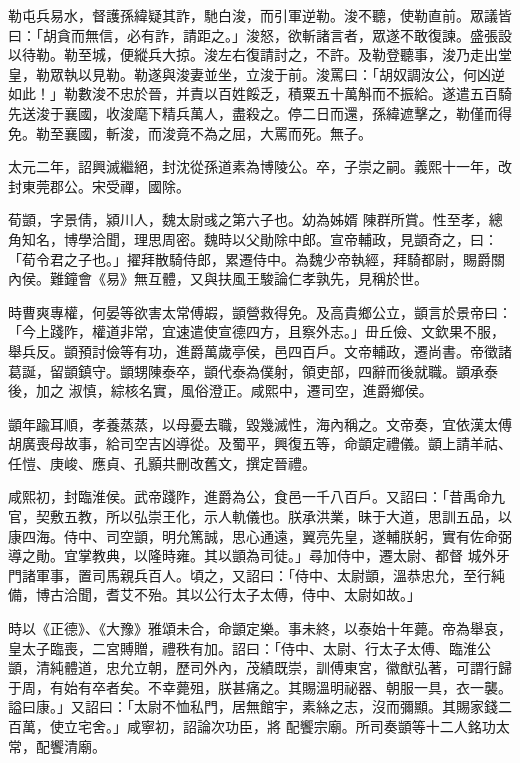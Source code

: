 \begin{pinyinscope}
 勒屯兵易水，督護孫緯疑其詐，馳白浚，而引軍逆勒。浚不聽，使勒直前。眾議皆曰：「胡貪而無信，必有詐，請距之。」浚怒，欲斬諸言者，眾遂不敢復諫。盛張設以待勒。勒至城，便縱兵大掠。浚左右復請討之，不許。及勒登聽事，浚乃走出堂
 皇，勒眾執以見勒。勒遂與浚妻並坐，立浚于前。浚罵曰：「胡奴調汝公，何凶逆如此！」勒數浚不忠於晉，并責以百姓餒乏，積粟五十萬斛而不振給。遂遣五百騎先送浚于襄國，收浚麾下精兵萬人，盡殺之。停二日而還，孫緯遮擊之，勒僅而得免。勒至襄國，斬浚，而浚竟不為之屈，大罵而死。無子。



 太元二年，詔興滅繼絕，封沈從孫道素為博陵公。卒，子崇之嗣。義熙十一年，改封東莞郡公。宋受禪，國除。



 荀顗，字景倩，潁川人，魏太尉彧之第六子也。幼為姊婿
 陳群所賞。性至孝，總角知名，博學洽聞，理思周密。魏時以父勛除中郎。宣帝輔政，見顗奇之，曰：「荀令君之子也。」擢拜散騎侍郎，累遷侍中。為魏少帝執經，拜騎都尉，賜爵關內侯。難鐘會《易》無互體，又與扶風王駿論仁孝孰先，見稱於世。



 時曹爽專權，何晏等欲害太常傅嘏，顗營救得免。及高貴鄉公立，顗言於景帝曰：「今上踐阼，權道非常，宜速遣使宣德四方，且察外志。」毌丘儉、文欽果不服，舉兵反。顗預討儉等有功，進爵萬歲亭侯，邑四百戶。文帝輔政，遷尚書。帝徵諸葛誕，留顗鎮守。顗甥陳泰卒，顗代泰為僕射，領吏部，四辭而後就職。顗承泰後，加之
 淑慎，綜核名實，風俗澄正。咸熙中，遷司空，進爵鄉侯。



 顗年踰耳順，孝養蒸蒸，以母憂去職，毀幾滅性，海內稱之。文帝奏，宜依漢太傅胡廣喪母故事，給司空吉凶導從。及蜀平，興復五等，命顗定禮儀。顗上請羊祜、任愷、庚峻、應貞、孔顥共刪改舊文，撰定晉禮。



 咸熙初，封臨淮侯。武帝踐阼，進爵為公，食邑一千八百戶。又詔曰：「昔禹命九官，契敷五教，所以弘崇王化，示人軌儀也。朕承洪業，昧于大道，思訓五品，以康四海。侍中、司空顗，明允篤誠，思心通遠，翼亮先皇，遂輔朕躬，實有佐命弼導之勛。宜掌教典，以隆時雍。其以顗為司徒。」尋加侍中，遷太尉、都督
 城外牙門諸軍事，置司馬親兵百人。頃之，又詔曰：「侍中、太尉顗，溫恭忠允，至行純備，博古洽聞，耆艾不殆。其以公行太子太傅，侍中、太尉如故。」



 時以《正德》、《大豫》雅頌未合，命顗定樂。事未終，以泰始十年薨。帝為舉哀，皇太子臨喪，二宮賻贈，禮秩有加。詔曰：「侍中、太尉、行太子太傅、臨淮公顗，清純體道，忠允立朝，歷司外內，茂績既崇，訓傅東宮，徽猷弘著，可謂行歸于周，有始有卒者矣。不幸薨殂，朕甚痛之。其賜溫明祕器、朝服一具，衣一襲。謚曰康。」又詔曰：「太尉不恤私門，居無館宇，素絲之志，沒而彌顯。其賜家錢二百萬，使立宅舍。」咸寧初，詔論次功臣，將
 配饗宗廟。所司奏顗等十二人銘功太常，配饗清廟。




\end{pinyinscope}
